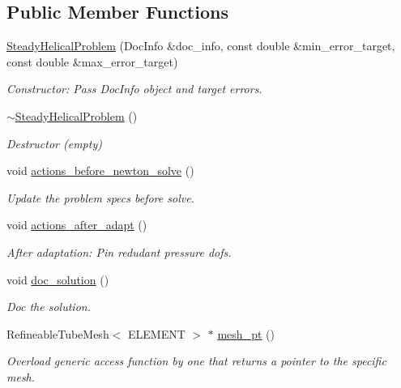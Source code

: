 \subsection*{Public Member Functions}
\begin{DoxyCompactItemize}
\item 
\hyperlink{classSteadyHelicalProblem_adbf13f3b2ffbcaaef6465d0d6583a1c9}{Steady\+Helical\+Problem} (Doc\+Info \&doc\+\_\+info, const double \&min\+\_\+error\+\_\+target, const double \&max\+\_\+error\+\_\+target)
\begin{DoxyCompactList}\small\item\em Constructor\+: Pass Doc\+Info object and target errors. \end{DoxyCompactList}\item 
\hyperlink{classSteadyHelicalProblem_adf88db88e0aef324db9a910126cac298}{$\sim$\+Steady\+Helical\+Problem} ()
\begin{DoxyCompactList}\small\item\em Destructor (empty) \end{DoxyCompactList}\item 
void \hyperlink{classSteadyHelicalProblem_a446b8b3e090f8349dc2c5de68190d6a4}{actions\+\_\+before\+\_\+newton\+\_\+solve} ()
\begin{DoxyCompactList}\small\item\em Update the problem specs before solve. \end{DoxyCompactList}\item 
void \hyperlink{classSteadyHelicalProblem_a7fb3fb4cfb399e20ac52816f9cdfc68d}{actions\+\_\+after\+\_\+adapt} ()
\begin{DoxyCompactList}\small\item\em After adaptation\+: Pin redudant pressure dofs. \end{DoxyCompactList}\item 
void \hyperlink{classSteadyHelicalProblem_af233588050a06523cd93f8bcdb0fa54c}{doc\+\_\+solution} ()
\begin{DoxyCompactList}\small\item\em Doc the solution. \end{DoxyCompactList}\item 
Refineable\+Tube\+Mesh$<$ E\+L\+E\+M\+E\+NT $>$ $\ast$ \hyperlink{classSteadyHelicalProblem_a8962f49b4abe06419311e2e9b312da67}{mesh\+\_\+pt} ()
\begin{DoxyCompactList}\small\item\em Overload generic access function by one that returns a pointer to the specific mesh. \end{DoxyCompactList}\end{DoxyCompactItemize}
